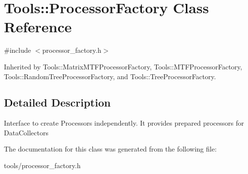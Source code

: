 \hypertarget{classTools_1_1ProcessorFactory}{\section{Tools\-:\-:Processor\-Factory Class Reference}
\label{classTools_1_1ProcessorFactory}
}


{\ttfamily \#include $<$processor\-\_\-factory.\-h$>$}



Inherited by Tools\-::\-Matrix\-M\-T\-F\-Processor\-Factory, Tools\-::\-M\-T\-F\-Processor\-Factory, Tools\-::\-Random\-Tree\-Processor\-Factory, and Tools\-::\-Tree\-Processor\-Factory.



\subsection{Detailed Description}
Interface to create Processors independently. It provides prepared processors for Data\-Collectors 

The documentation for this class was generated from the following file\-:\begin{DoxyCompactItemize}
\item 
tools/processor\-\_\-factory.\-h\end{DoxyCompactItemize}
